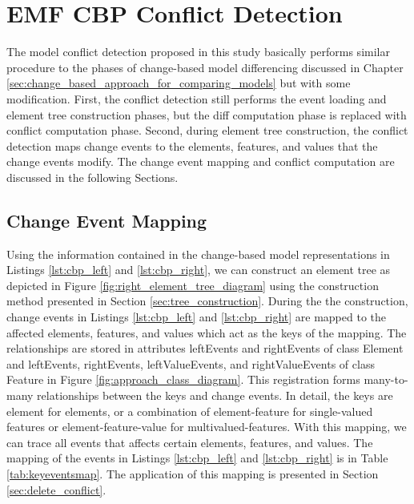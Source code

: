 \section{EMF CBP Conflict Detection}
\label{sec:emf_cbp_conflict_detection}

The model conflict detection proposed in this study basically performs similar procedure to the phases of change-based model differencing discussed in Chapter \ref{sec:change_based_approach_for_comparing_models} but with some modification. First, the conflict detection still performs the event loading and element tree construction phases, but the diff computation phase is replaced with conflict computation phase. Second, during element tree construction, the conflict detection maps change events to the elements, features, and values that the change events modify. The change event mapping and conflict computation are discussed in the following Sections.

\subsection{Change Event Mapping}
\label{sec:change_event_mapping}
Using the information contained in the change-based model representations in Listings \ref{lst:cbp_left} and \ref{lst:cbp_right}, we can construct an element tree as depicted in Figure \ref{fig:right_element_tree_diagram} using the construction method presented in Section \ref{sec:tree_construction}. During the the construction, change events in Listings \ref{lst:cbp_left} and \ref{lst:cbp_right} are mapped to the affected elements, features, and values which act as the keys of the mapping. The relationships are stored in attributes \textsf{leftEvents} and \textsf{rightEvents} of class \textsf{Element} and \textsf{leftEvents}, \textsf{rightEvents}, \textsf{leftValueEvents}, and \textsf{rightValueEvents} of class \textsf{Feature} in Figure \ref{fig:approach_class_diagram}. This registration forms many-to-many relationships between the keys and change events. In detail, the keys are \textsf{element} for elements, or a combination of \textsf{element-feature} for single-valued features or \textsf{element-feature-value} for multivalued-features. With this mapping, we can trace all events that affects certain elements, features, and values. The mapping of the events in Listings \ref{lst:cbp_left} and \ref{lst:cbp_right} is in Table \ref{tab:keyeventsmap}. The application of this mapping is presented in Section \ref{sec:delete_conflict}.

